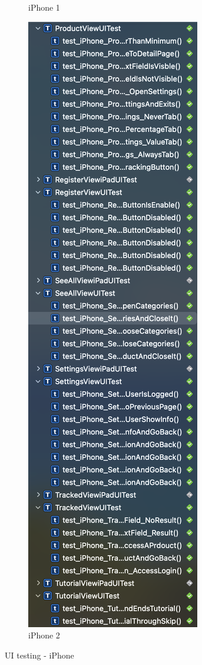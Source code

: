 \begin{figure}[h!]
\begin{subfigure}[b]{0.3\textwidth}
            \caption{iPhone 1}
            \label{fig:ui_testing_iphone_1}
        \end{subfigure}
        \begin{subfigure}[b]{0.3\textwidth}
            \centering
            \includegraphics[width=\textwidth]{images/testing/ui_testing_iphone_2.png}
            \caption{iPhone 2}
            \label{fig:ui_testing_iphone_2}
        \end{subfigure}
         \caption{UI testing - iPhone}
        \label{fig:ui_testing_iphone}
\end{figure}
